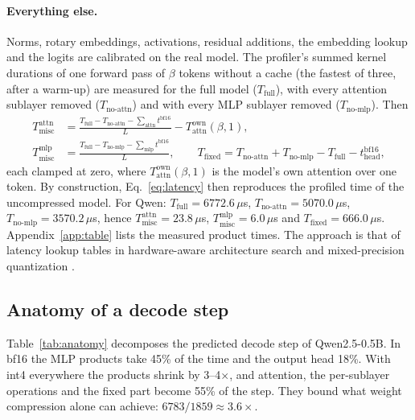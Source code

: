 \documentclass[11pt]{article}
\newcommand{\us}{\,$\mu$s}
\begin{document}
\paragraph{Everything else.}
Norms, rotary embeddings, activations, residual additions, the embedding lookup and the logits are
calibrated on the real model. The profiler's summed kernel durations of one forward pass of $\beta$
tokens without a cache (the fastest of three, after a warm-up) are measured for the full model
($T_{\text{full}}$), with every attention sublayer removed ($T_{\text{no-attn}}$) and with every MLP
sublayer removed ($T_{\text{no-mlp}}$). Then
\begin{align}
  T^{\text{attn}}_{\text{misc}} &= \frac{T_{\text{full}}-T_{\text{no-attn}}-\sum_{\text{attn}}t^{\text{bf16}}}{L} - T^{\text{own}}_{\text{attn}}(\beta,1), \\
  T^{\text{mlp}}_{\text{misc}}  &= \frac{T_{\text{full}}-T_{\text{no-mlp}}-\sum_{\text{mlp}}t^{\text{bf16}}}{L}, \qquad
  T_{\text{fixed}} = T_{\text{no-attn}}+T_{\text{no-mlp}}-T_{\text{full}}-t^{\text{bf16}}_{\text{head}},
\end{align}
each clamped at zero, where $T^{\text{own}}_{\text{attn}}(\beta,1)$ is the model's own attention over one
token. By construction, Eq.~\eqref{eq:latency} then reproduces the profiled time of the uncompressed
model. For Qwen: $T_{\text{full}}=6772.6$\us, $T_{\text{no-attn}}=5070.0$\us, $T_{\text{no-mlp}}=3570.2$\us,
hence $T^{\text{attn}}_{\text{misc}}=23.8$\us, $T^{\text{mlp}}_{\text{misc}}=6.0$\us{} and
$T_{\text{fixed}}=666.0$\us. Appendix~\ref{app:table} lists the measured product times. The
approach is that of latency lookup tables in hardware-aware architecture search
\cite{cai2019proxylessnas,wu2019fbnet} and mixed-precision quantization \cite{wang2019haq,yao2021hawqv3}.

\subsection{Anatomy of a decode step}
Table~\ref{tab:anatomy} decomposes the predicted decode step of Qwen2.5-0.5B. In bf16 the MLP products
take 45\% of the time and the output head 18\%. With int4 everywhere the products shrink by
3--4$\times$, and attention, the per-sublayer operations and the fixed part become 55\% of the step. They
bound what weight compression alone can achieve: $6783/1859\approx3.6\times$.
\end{document}
